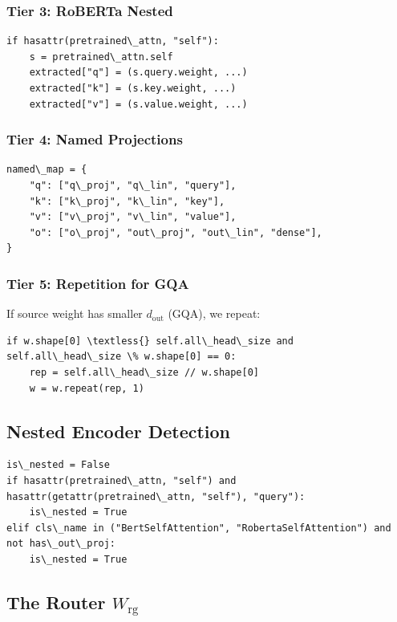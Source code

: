 \subsubsection{Tier 3: RoBERTa Nested}

\begin{lstlisting}
if hasattr(pretrained\_attn, "self"):
    s = pretrained\_attn.self
    extracted["q"] = (s.query.weight, ...)
    extracted["k"] = (s.key.weight, ...)
    extracted["v"] = (s.value.weight, ...)
\end{lstlisting}

\subsubsection{Tier 4: Named Projections}

\begin{lstlisting}
named\_map = {
    "q": ["q\_proj", "q\_lin", "query"],
    "k": ["k\_proj", "k\_lin", "key"],
    "v": ["v\_proj", "v\_lin", "value"],
    "o": ["o\_proj", "out\_proj", "out\_lin", "dense"],
}
\end{lstlisting}

\subsubsection{Tier 5: Repetition for GQA}

If source weight has smaller $d_\text{out}$ (GQA), we repeat:

\begin{lstlisting}
if w.shape[0] \textless{} self.all\_head\_size and self.all\_head\_size \% w.shape[0] == 0:
    rep = self.all\_head\_size // w.shape[0]
    w = w.repeat(rep, 1)
\end{lstlisting}

\subsection{Nested Encoder Detection}

\begin{lstlisting}
is\_nested = False
if hasattr(pretrained\_attn, "self") and hasattr(getattr(pretrained\_attn, "self"), "query"):
    is\_nested = True
elif cls\_name in ("BertSelfAttention", "RobertaSelfAttention") and not has\_out\_proj:
    is\_nested = True
\end{lstlisting}

\subsection{The Router $W_\text{rg}$}

